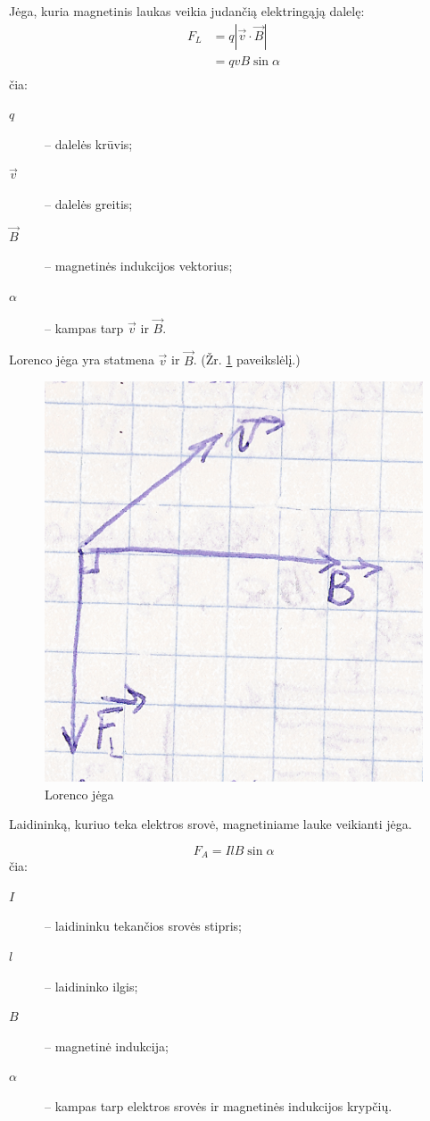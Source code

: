\begin{defn}
  Jėga, kuria magnetinis laukas veikia judančią elektringąją dalelę:
  \begin{align*}
    F_{L}
    &= q | \vec{v} \cdot \vec{B}| \\
    &= q v B \sin \alpha \\
  \end{align*}
  čia:
  \begin{description}
    \item[$q$] – dalelės krūvis;
    \item[$\vec{v}$] – dalelės greitis;
    \item[$\vec{B}$] – magnetinės indukcijos vektorius;
    \item[$\alpha$] – kampas tarp $\vec{v}$ ir $\vec{B}$.
  \end{description}
  Lorenco jėga yra statmena $\vec{v}$ ir $\vec{B}$.
  (Žr. \ref{fig:lorenco_jega} paveikslėlį.)
\end{defn}

\begin{figure}[H]
  \begin{center}
    \includegraphics[height=0.5\textwidth]{images/lorenco_jega.png}
  \end{center}
  \caption{Lorenco jėga}
  \label{fig:lorenco_jega}
\end{figure}

\begin{defn}
  Laidininką, kuriuo teka elektros srovė, magnetiniame lauke veikianti
  jėga.

  \begin{equation*}
    F_{A} = I l B \sin \alpha
  \end{equation*}
  čia:
  \begin{description}
    \item[$I$] – laidininku tekančios srovės stipris;
    \item[$l$] – laidininko ilgis;
    \item[$B$] – magnetinė indukcija;
    \item[$\alpha$] – kampas tarp elektros srovės ir magnetinės
      indukcijos krypčių.
  \end{description}
\end{defn}

